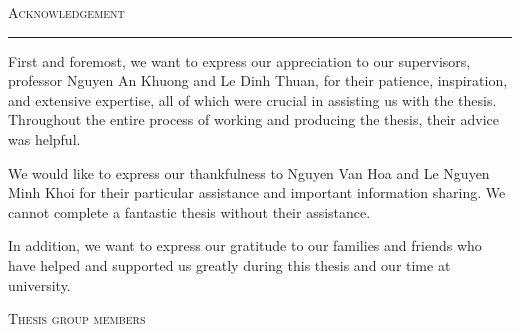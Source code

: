 \thispagestyle{empty}
\vspace*{3cm}
\noindent\Huge\textsc{Acknowledgement}\\
\normalsize
\noindent\rule[2pt]{\textwidth}{0.8pt}
\hspace*{5cm}
 
First and foremost, we want to express our appreciation to our supervisors, professor Nguyen An Khuong and Le Dinh Thuan, for their patience, inspiration, and extensive expertise, all of which were crucial in assisting us with the thesis. Throughout the entire process of working and producing the thesis, their advice was helpful.

We would like to express our thankfulness to Nguyen Van Hoa and Le Nguyen Minh Khoi for their particular assistance and important information sharing. We cannot complete a fantastic thesis without their assistance.


In addition, we want to express our gratitude to our families and friends who have helped and supported us greatly during this thesis and our time at university.
	
	\hfill \textsc{Thesis group members}
	
\cleardoublepage
